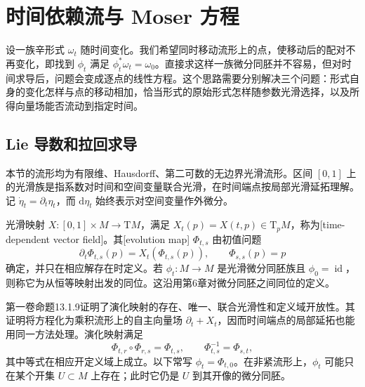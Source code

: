 
% 
% 

\section{时间依赖流与 Moser 方程}
\label{g4:sec:0801}

设一族辛形式 \(\omega_t\) 随时间变化。我们希望同时移动流形上的点，使移动后的配对不再变化，即找到 \(\phi_t\) 满足 \(\phi_t^*\omega_t=\omega_0\)。直接求这样一族微分同胚并不容易，但对时间求导后，问题会变成逐点的线性方程。这个思路需要分别解决三个问题：形式自身的变化怎样与点的移动相加，恰当形式的原始形式怎样随参数光滑选择，以及所得向量场能否流动到指定时间。

\subsection{Lie 导数和拉回求导}
\label{g4:subsec:0801:01}

本节的流形均为有限维、Hausdorff、第二可数的无边界光滑流形。区间 \([0,1]\) 上的光滑族是指系数对时间和空间变量联合光滑，在时间端点按局部光滑延拓理解。记 \(\dot\eta_t=\partial_t\eta_t\)，而 \(\mathrm{d}\eta_t\) 始终表示对空间变量作外微分。

\begin{definition}\label{g4:def:0801:time-dependent-flow}
	光滑映射 \(X:[0,1]\times M\to\mathrm{T}M\)，满足 \(X_t(p)=X(t,p)\in\mathrm{T}_pM\)，称为[time-dependent vector field]。其[evolution map] \(\Phi_{t,s}\) 由初值问题
	\[
		\partial_t\Phi_{t,s}(p)=X_t(\Phi_{t,s}(p)),
		\qquad \Phi_{s,s}(p)=p
	\]
	确定，并只在相应解存在时定义。若 \(\phi_t:M\to M\) 是光滑微分同胚族且 \(\phi_0=\operatorname{id}\)，则称它为从恒等映射出发的同位。这沿用第6章对微分同胚之间同位的定义。
\end{definition}

第一卷命题13.1.9证明了演化映射的存在、唯一、联合光滑性和定义域开放性。其证明将方程化为乘积流形上的自主向量场 \(\partial_t+X_t\)，因而时间端点的局部延拓也能用同一方法处理。演化映射满足
\begin{equation}\label{g4:eq:0801:evolution-law}
	\Phi_{t,r}\circ\Phi_{r,s}=\Phi_{t,s},\qquad
	\Phi_{t,s}^{-1}=\Phi_{s,t},
\end{equation}
其中等式在相应开定义域上成立。以下常写 \(\phi_t=\Phi_{t,0}\)。在非紧流形上，\(\phi_t\) 可能只在某个开集 \(U\subset M\) 上存在；此时它仍是 \(U\) 到其开像的微分同胚。

